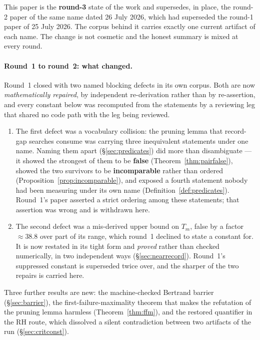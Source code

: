 \documentclass[11pt,a4paper]{article}
\theoremstyle{plain}
\theoremstyle{definition}
\theoremstyle{remark}
\begin{document}
This paper is the \textbf{round-3} state of the work and supersedes, in place, the round-2
paper of the same name dated 26 July 2026, which had superseded the round-1 paper of 25 July
2026. The corpus behind it carries exactly one current artifact of each name. The change is
not cosmetic and the honest summary is mixed at every round.

\paragraph{Round~1 to round~2: what changed.} Round~1 closed with two named blocking defects in its own corpus.
Both are now \emph{mathematically repaired}, by independent re-derivation rather than by
re-assertion, and every constant below was recomputed from the statements by a reviewing leg
that shared no code path with the leg being reviewed.
\begin{enumerate}
\item The first defect was a vocabulary collision: the pruning lemma that record-gap searches
  consume was carrying three inequivalent statements under one name. Naming them apart
  (\S\ref{sec:predicates}) did more than disambiguate --- it showed the strongest of them to be
  \textbf{false} (Theorem~\ref{thm:pairfalse}), showed the two survivors to be
  \textbf{incomparable} rather than ordered (Proposition~\ref{prop:incomparable}), and exposed a
  fourth statement nobody had been measuring under its own name
  (Definition~\ref{def:predicates}). Round~1's paper asserted a strict ordering among these
  statements; that assertion was wrong and is withdrawn here.
\item The second defect was a mis-derived upper bound on $T_m$, false by a factor
  $\approx 38.8$ over part of its range, which round~1 declined to state a constant for. It is
  now restated in its tight form and \emph{proved} rather than checked numerically, in two
  independent ways (\S\ref{sec:nearrecord}). Round~1's suppressed constant is superseded twice
  over, and the sharper of the two repairs is carried here.
\end{enumerate}
Three further results are new: the machine-checked Bertrand barrier (\S\ref{sec:barrier}), the
first-failure-maximality theorem that makes the refutation of the pruning lemma harmless
(Theorem~\ref{thm:ffm}), and the restored quantifier in the RH route, which dissolved a silent
contradiction between two artifacts of the run (\S\ref{sec:critconst}).
\end{document}
